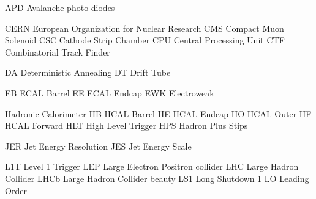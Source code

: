 
  {APD}  {Avalanche photo-diodes}


 {CERN} {European Organization for Nuclear Research} %
  {CMS}  {Compact Muon Solenoid}
  {CSC}  {Cathode Strip Chamber}
  {CPU}  {Central Processing Unit}
  {CTF}  {Combinatorial Track Finder}

 {DA} {Deterministic Annealing}
 {DT} {Drift Tube}

  {EB}  {ECAL Barrel}
  {EE}  {ECAL Endcap}
 {EWK} {Electroweak}



  {Hadronic Calorimeter}
  {HB}    {HCAL Barrel}
  {HE}    {HCAL Endcap}
  {HO}    {HCAL Outer}
  {HF}    {HCAL Forward}
 {HLT}   {High Level Trigger}
 {HPS}   {Hadron Plus Stips}


 {JER} {Jet Energy Resolution}
 {JES} {Jet Energy Scale}


   {L1T}   {Level 1 Trigger}
   {LEP}   {Large Electron Positron collider}
   {LHC}   {Large Hadron Collider}
  {LHCb}  {Large Hadron Collider beauty}
   {LS1}   {Long Shutdown 1}
    {LO}    {Leading Order}

